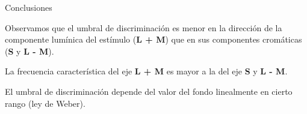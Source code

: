 \documentclass[
    11pt, %
    aspectratio=169, %
]{beamer}
\begin{document}
\begin{frame}{Conclusiones}
\begin{block}{}
    Observamos que el umbral de discriminación es menor en la dirección de la componente lumínica del estímulo (\textbf{L + M}) que en sus componentes cromáticas (\textbf{S} y \textbf{L - M}).
    	\end{block}

\begin{exampleblock}{}
    La frecuencia característica del eje \textbf{L + M} es mayor a la del eje \textbf{S} y \textbf{L - M}.
    	\end{exampleblock}

\begin{alertblock}{}
    El umbral de discriminación depende del valor del fondo linealmente en cierto rango (ley de Weber).
    	\end{alertblock}
        
\end{frame}


   

\end{document}
